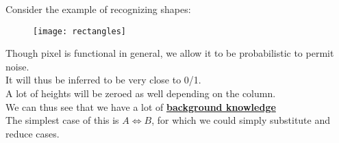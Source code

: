 \documentclass[../../lecture_notes.tex]{subfiles}
\begin{document}
\noindent Consider the example of recognizing shapes:
\begin{center}\begin{figure}[H]
	\texttt{[image: rectangles]}
\end{figure}\end{center}
\noindent Though pixel is functional in general, we allow it to be probabilistic to permit noise.\\
It will thus be inferred to be very close to 0/1.\\
A lot of heights will be zeroed as well depending on the column.\\
We can thus see that we have a lot of \textbf{\underline{background knowledge}}\\
\indent The simplest case of this is $A \iff B$, for which we could simply substitute and reduce cases.
\end{document}
